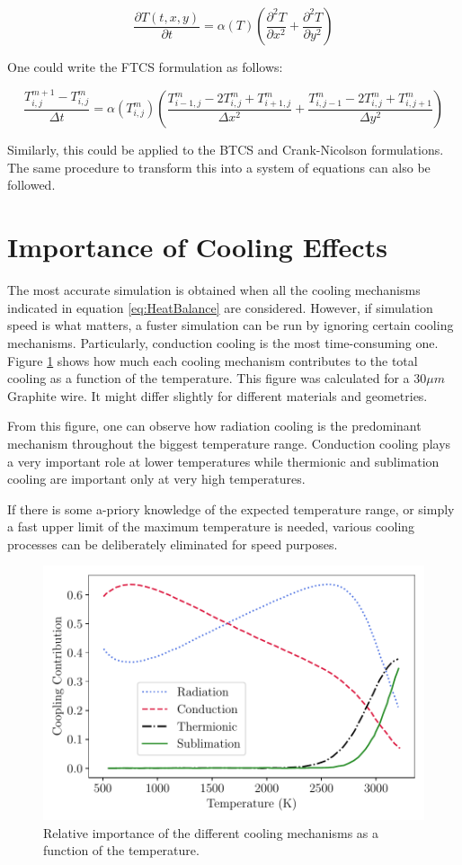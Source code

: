 \begin{equation}
    \frac{\partial T(t,x,y)}{\partial t} = \alpha (T) \left(\frac{\partial^2 T}{\partial x^2}+\frac{\partial ^2 T}{\partial y^2}\right)
\end{equation}

One could write the FTCS formulation as follows: 

\begin{equation}
    \frac{T_{i,j}^{m+1} - T_{i,j}^{m}}{\Delta t} = \alpha(T_{i,j}^{m}) \left( \frac{T_{i-1,j}^{m} -2T_{i,j}^{m}+T_{i+1,j}^{m}}{\Delta x^2} +  \frac{T_{i,j-1}^{m}-2T_{i,j}^{m}+T_{i,j+1}^{m}}{\Delta y^2} \right)
\end{equation}

Similarly, this could be applied to the BTCS and Crank-Nicolson formulations. The same procedure to transform this into a system of equations can also be followed. 

\section{Importance of Cooling Effects}

The most accurate simulation is obtained when all the cooling mechanisms indicated in equation \ref{eq:HeatBalance} are considered. However, if simulation speed is what matters, a fuster simulation can be run by ignoring certain cooling mechanisms. Particularly, conduction cooling is the most time-consuming one. Figure \ref{fig:CoolingComparison} shows how much each cooling mechanism contributes to the total cooling as a function of the temperature. This figure was calculated for a $30 \mu m$ Graphite wire. It might differ slightly for different materials and geometries. 

From this figure, one can observe how radiation cooling is the predominant mechanism throughout the biggest temperature range. Conduction cooling plays a very important role at lower temperatures while thermionic and sublimation cooling are important only at very high temperatures. 

If there is some a-priory knowledge of the expected temperature range, or simply a fast upper limit of the maximum temperature is needed, various cooling processes can be deliberately eliminated for speed purposes.

\begin{figure}[h]
    \centering
    \includegraphics[width=0.60\columnwidth]{PlotCoolingImportancfe/CoolingImpo.pdf}
    \caption{Relative importance of the different cooling mechanisms as a function of the temperature.}
    \label{fig:CoolingComparison}
\end{figure}

